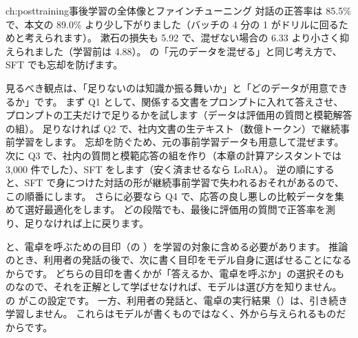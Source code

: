 \begin{answers}{ch:posttraining}{事後学習の全体像とファインチューニング}
対話の正答率は 85.5\% で、本文の 89.0\% より少し下がりました（バッチの 4 分の 1 がドリルに回るためと考えられます）。
漱石の損失も 5.92 で、混ぜない場合の 6.33 より小さく抑えられました（学習前は 4.88）。
の「元のデータを混ぜる」と同じ考え方で、SFT でも忘却を防げます。
\item 見るべき観点は、「足りないのは知識か振る舞いか」と「どのデータが用意できるか」です。
まず Q1 として、関係する文書をプロンプトに入れて答えさせ、プロンプトの工夫だけで足りるかを試します（データは評価用の質問と模範解答の組）。
足りなければ Q2 で、社内文書の生テキスト（数億トークン）で継続事前学習をします。
忘却を防ぐため、元の事前学習データも用意して混ぜます。
次に Q3 で、社内の質問と模範応答の組を作り（本章の計算アシスタントでは 3,000 件でした）、SFT をします（安く済ませるなら LoRA）。
逆の順にすると、SFT で身につけた対話の形が継続事前学習で失われるおそれがあるので、この順番にします。
さらに必要なら Q4 で、応答の良し悪しの比較データを集めて選好最適化をします。
どの段階でも、最後に評価用の質問で正答率を測り、足りなければ上に戻ります。
\item {} と、電卓を呼ぶための目印（の ）を学習の対象に含める必要があります。
推論のとき、利用者の発話の後で、次に書く目印をモデル自身に選ばせることになるからです。
どちらの目印を書くかが「答えるか、電卓を呼ぶか」の選択そのものなので、それを正解として学ばせなければ、モデルは選び方を知りません。
 の  がこの設定です。
一方、利用者の発話と、電卓の実行結果（）は、引き続き学習しません。
これらはモデルが書くものではなく、外から与えられるものだからです。
\end{answers}
